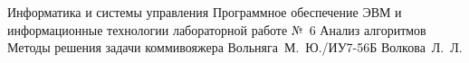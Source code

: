 \documentclass{bmstu}
\begin{document}
\makereporttitle
	{Информатика и системы управления} %
	{Программное обеспечение ЭВМ и информационные технологии} %
	{лабораторной работе №~6} %
	{Анализ алгоритмов} %
	{Методы решения задачи коммивояжера} %
	{} %
	{Вольняга~М.~Ю./ИУ7-56Б} %
	{Волкова~Л.~Л.} %

\maketableofcontents

%








\makebibliography
\end{document}
